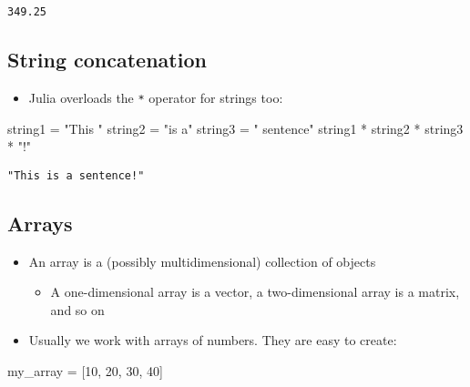 \documentclass[
  letterpaper,
  DIV=11,
  numbers=noendperiod]{scrartcl}
\newenvironment{Shaded}{\begin{snugshade}}{\end{snugshade}}
\newcommand{\FloatTok}[1]{\textcolor[rgb]{0.68,0.00,0.00}{#1}}
\newcommand{\NormalTok}[1]{\textcolor[rgb]{0.00,0.23,0.31}{#1}}
\newcommand{\OperatorTok}[1]{\textcolor[rgb]{0.37,0.37,0.37}{#1}}
\newcommand{\StringTok}[1]{\textcolor[rgb]{0.13,0.47,0.30}{#1}}
\providecommand{\tightlist}{%
  \setlength{\itemsep}{0pt}\setlength{\parskip}{0pt}}\usepackage{longtable,booktabs,array}
\begin{document}
\begin{verbatim}
349.25
\end{verbatim}

\subsection{String concatenation}\label{string-concatenation}

\begin{itemize}
\tightlist
\item
  Julia overloads the \texttt{*} operator for strings too:
\end{itemize}

\begin{Shaded}
\begin{Highlighting}[]
\NormalTok{string1 }\OperatorTok{=} \StringTok{"This "}
\NormalTok{string2 }\OperatorTok{=} \StringTok{"is a"}
\NormalTok{string3 }\OperatorTok{=} \StringTok{" sentence"}
\NormalTok{string1 }\OperatorTok{*}\NormalTok{ string2 }\OperatorTok{*}\NormalTok{ string3 }\OperatorTok{*} \StringTok{"!"}
\end{Highlighting}
\end{Shaded}

\begin{verbatim}
"This is a sentence!"
\end{verbatim}

\subsection{Arrays}\label{arrays}

\begin{itemize}
\tightlist
\item
  An array is a (possibly multidimensional) collection of objects

  \begin{itemize}
  \tightlist
  \item
    A one-dimensional array is a vector, a two-dimensional array is a
    matrix, and so on
  \end{itemize}
\item
  Usually we work with arrays of numbers. They are easy to create:
\end{itemize}

\begin{Shaded}
\begin{Highlighting}[]
\NormalTok{my\_array }\OperatorTok{=}\NormalTok{ [}\FloatTok{10}\NormalTok{, }\FloatTok{20}\NormalTok{, }\FloatTok{30}\NormalTok{, }\FloatTok{40}\NormalTok{]}
\end{Highlighting}
\end{Shaded}
\end{document}
